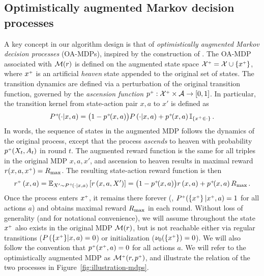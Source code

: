 \subsection{Optimistically augmented Markov decision processes}\label{sec:OAMDP}

A key concept in our algorithm design is that of \emph{optimistically augmented Markov decision processes} (OA-MDPs), inspired by the construction of \citet{brafman2002r}. The OA-MDP associated with $\cM(r)$ is defined on the augmented state space $\cX^\upplus = \cX \cup \ev{x^\upplus}$, where $x^\upplus$ is an artificial \emph{heaven} state appended to the original set of states. The transition dynamics are defined via a perturbation of the original transition function, governed by the \emph{ascension function} $p^\upplus:\cX^\upplus\times\cA\ra[0,1]$. In particular, the transition kernel from state-action pair $x,a$ to $x'$ is defined as
%
\begin{align*}
    P^\upplus \!\!\spr{\cdot \middle| x, a} = \bpa{1 - p^\upplus  \!\!\spr{x, a}} P \spr{\cdot \middle| x, a} + p^\upplus \!\!\spr{x, a} \II{x^\upplus\in \cdot}\,.
\end{align*}
%
In words, the sequence of states in the augmented MDP follows the dynamics of the original process, except that the process \emph{ascends} to heaven with probability $p^\upplus (X_t, A_t)$ in round $t$. The augmented reward function is the same for all triples in the original MDP $x,a,x'$, and ascension to heaven results in maximal reward $r(x,a,x^\upplus) = \RMAX$. The resulting state-action reward function is then
%
\begin{equation*}
    r^\upplus \spr{x, a} = \EEs{r \spr{x, a, X'}}{X'\sim P^\upplus \!\spr{\cdot \middle| x, a}} = \bpa{1 - p^\upplus \!\!\spr{x, a}} r \spr{x, a} + p^\upplus \!\!\spr{x, a} \RMAX\,.
\end{equation*}
%
Once the process enters $x^\upplus$, it remains there forever (\ie, $P^\upplus(\ev{x^\upplus}|x^\upplus,a) =1$ for all actions $a$) and obtains maximal reward $\RMAX$ in each round. Without loss of generality (and for notational convenience), we will assume throughout the state $x^\upplus$ also exists in the original MDP $\cM(r)$, but is not reachable either via regular transitions ($P \spr{\ev{x^\upplus} \middle| x, a} = 0$) or initialization ($\nu_0(\ev{x^\upplus})=0$). We will also follow the convention that $p^\upplus(x^\upplus,a)=0$ for all actions $a$. We will refer to the optimistically augmented MDP as $\cM^\upplus(r,p^\upplus)$, and illustrate the relation of the two processes in Figure~\ref{fig:illustration-mdps}.

